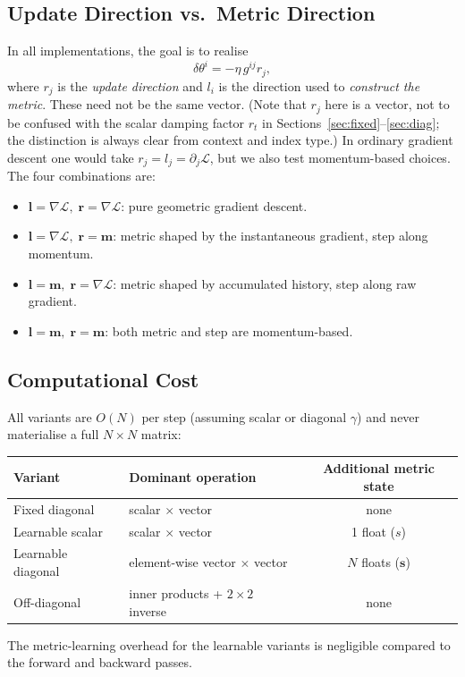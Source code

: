 \documentclass{article}
\newcommand{\loss}{\mathcal{L}}
\newcommand{\vecb}[1]{\boldsymbol{#1}}
\begin{document}
\subsection{Update Direction vs.\ Metric Direction}
In all implementations, the goal is to realise $$
    \delta\theta^i = -\eta\, g^{ij} r_j,
$$ where $r_j$ is the \emph{update direction} and $l_i$ is the direction used to \emph{construct the metric}.
These need not be the same vector.
(Note that $r_j$ here is a vector, not to be confused with the scalar
damping factor $r_t$ in Sections~\ref{sec:fixed}--\ref{sec:diag};
the distinction is always clear from context and index type.)
In ordinary gradient descent one would take $r_j = l_j = \partial_j\loss$,
but we also test momentum-based choices.
The four combinations are:
\begin{itemize}
    \item $\vecb{l} = \nabla\loss,\; \vecb{r} = \nabla\loss$: pure geometric gradient descent.
    \item $\vecb{l} = \nabla\loss,\; \vecb{r} = \vecb{m}$: metric shaped by the instantaneous gradient, step along momentum.
    \item $\vecb{l} = \vecb{m},\; \vecb{r} = \nabla\loss$: metric shaped by accumulated history, step along raw gradient.
    \item $\vecb{l} = \vecb{m},\; \vecb{r} = \vecb{m}$: both metric and step are momentum-based.
\end{itemize}

\subsection{Computational Cost}
All variants are $O(N)$ per step (assuming scalar or diagonal $\gamma$) and never materialise a full $N\times N$ matrix:
\begin{center}
\small
\begin{tabular}{llc}
    \toprule
    \textbf{Variant} & \textbf{Dominant operation} & \textbf{Additional metric state} \\
    \midrule
    Fixed diagonal     & scalar $\times$ vector               & none \\
    Learnable scalar   & scalar $\times$ vector               & 1 float ($s$) \\
    Learnable diagonal & element-wise vector $\times$ vector  & $N$ floats ($\vecb{s}$) \\
    Off-diagonal       & inner products + $2\times2$ inverse  & none \\
    \bottomrule
\end{tabular}
\end{center}
The metric-learning overhead for the learnable variants is negligible compared to the forward and backward passes.
\end{document}
